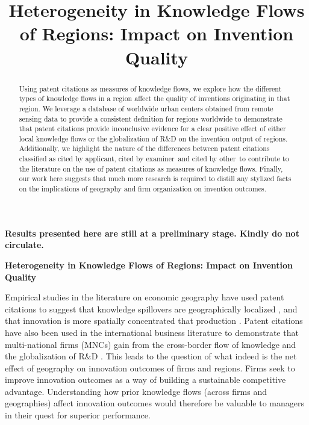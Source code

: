 \documentclass[12pt,letterpaper]{article}
\begin{document}

\setlength{\droptitle}{-5em}
\title{\textbf{\large Heterogeneity in Knowledge Flows of Regions: Impact on Invention Quality}}
\date{\vspace{-12ex}}

\maketitle
\thispagestyle{empty}
\renewcommand{\abstractname}{\normalsize ABSTRACT}
\begin{abstract}
\normalsize
\noindent Using patent citations as measures of knowledge flows, we explore how the different types of knowledge flows in a region affect the quality of inventions originating in that region. We leverage a database of worldwide urban centers  obtained from remote sensing data to provide a consistent definition for regions worldwide to demonstrate that patent citations provide inconclusive evidence for a clear positive effect of either local knowledge flows or the globalization of R\&D on the invention output of regions. Additionally, we highlight the nature of the differences between patent citations classified as \textquotesingle cited by applicant\textquotesingle, \textquotesingle cited by examiner\textquotesingle \ and \textquotesingle cited by other\textquotesingle \ to contribute to the literature on the use of patent citations as measures of knowledge flows. Finally, our work here suggests that much more research is required to distill any stylized facts on the implications of geography and firm organization on invention outcomes. 
\end{abstract}
\vspace{30ex}
\textbf{Results presented here are still at a preliminary stage. Kindly do not circulate.}
\newpage
\pagestyle{fancy}
\fancyhf{}
\rhead{\thepage}

\textbf{Heterogeneity in Knowledge Flows of Regions: Impact on Invention Quality}

\vspace{3ex}


\noindent Empirical studies in the literature on economic geography have used patent citations to suggest that knowledge spillovers are geographically localized \citep*{Jaffe1993, Almeida1999, Branstetter2001, Sonn2008}, and that innovation is more spatially concentrated that production \citep{Feldman1994a}. Patent citations have also been used in the international business literature to demonstrate that multi-national firms (MNCs) gain from the cross-border flow of knowledge and the globalization of R\&D \citep{Singh2007, Zhao2006, Singh2013}. This leads to the question of what indeed is the net effect of geography on innovation outcomes of firms and regions. Firms seek to improve innovation outcomes as a way of building a sustainable competitive advantage. Understanding how prior knowledge flows (across firms and geographies) affect innovation outcomes would therefore be valuable to managers in their quest for superior performance. \par
\end{document}
